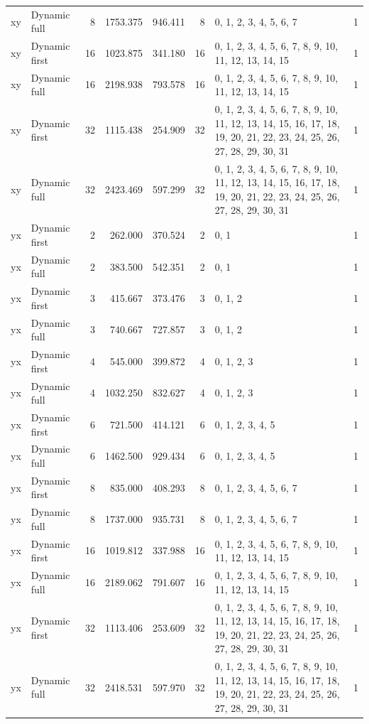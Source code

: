 \documentclass[10pt,a4paper]{article}
\begin{document}
\begin{longtable}{@{}p{23mm}p{29mm}rrrrp{36mm}r@{}}
xy & Dynamic full & 8 & 1753.375 & 946.411 & 8 & 0, 1, 2, 3, 4, 5, 6, 7 & 1 \\
xy & Dynamic first & 16 & 1023.875 & 341.180 & 16 & 0, 1, 2, 3, 4, 5, 6, 7, 8, 9, 10, 11, 12, 13, 14, 15 & 1 \\
xy & Dynamic full & 16 & 2198.938 & 793.578 & 16 & 0, 1, 2, 3, 4, 5, 6, 7, 8, 9, 10, 11, 12, 13, 14, 15 & 1 \\
xy & Dynamic first & 32 & 1115.438 & 254.909 & 32 & 0, 1, 2, 3, 4, 5, 6, 7, 8, 9, 10, 11, 12, 13, 14, 15, 16, 17, 18, 19, 20, 21, 22, 23, 24, 25, 26, 27, 28, 29, 30, 31 & 1 \\
xy & Dynamic full & 32 & 2423.469 & 597.299 & 32 & 0, 1, 2, 3, 4, 5, 6, 7, 8, 9, 10, 11, 12, 13, 14, 15, 16, 17, 18, 19, 20, 21, 22, 23, 24, 25, 26, 27, 28, 29, 30, 31 & 1 \\
yx & Dynamic first & 2 & 262.000 & 370.524 & 2 & 0, 1 & 1 \\
yx & Dynamic full & 2 & 383.500 & 542.351 & 2 & 0, 1 & 1 \\
yx & Dynamic first & 3 & 415.667 & 373.476 & 3 & 0, 1, 2 & 1 \\
yx & Dynamic full & 3 & 740.667 & 727.857 & 3 & 0, 1, 2 & 1 \\
yx & Dynamic first & 4 & 545.000 & 399.872 & 4 & 0, 1, 2, 3 & 1 \\
yx & Dynamic full & 4 & 1032.250 & 832.627 & 4 & 0, 1, 2, 3 & 1 \\
yx & Dynamic first & 6 & 721.500 & 414.121 & 6 & 0, 1, 2, 3, 4, 5 & 1 \\
yx & Dynamic full & 6 & 1462.500 & 929.434 & 6 & 0, 1, 2, 3, 4, 5 & 1 \\
yx & Dynamic first & 8 & 835.000 & 408.293 & 8 & 0, 1, 2, 3, 4, 5, 6, 7 & 1 \\
yx & Dynamic full & 8 & 1737.000 & 935.731 & 8 & 0, 1, 2, 3, 4, 5, 6, 7 & 1 \\
yx & Dynamic first & 16 & 1019.812 & 337.988 & 16 & 0, 1, 2, 3, 4, 5, 6, 7, 8, 9, 10, 11, 12, 13, 14, 15 & 1 \\
yx & Dynamic full & 16 & 2189.062 & 791.607 & 16 & 0, 1, 2, 3, 4, 5, 6, 7, 8, 9, 10, 11, 12, 13, 14, 15 & 1 \\
yx & Dynamic first & 32 & 1113.406 & 253.609 & 32 & 0, 1, 2, 3, 4, 5, 6, 7, 8, 9, 10, 11, 12, 13, 14, 15, 16, 17, 18, 19, 20, 21, 22, 23, 24, 25, 26, 27, 28, 29, 30, 31 & 1 \\
yx & Dynamic full & 32 & 2418.531 & 597.970 & 32 & 0, 1, 2, 3, 4, 5, 6, 7, 8, 9, 10, 11, 12, 13, 14, 15, 16, 17, 18, 19, 20, 21, 22, 23, 24, 25, 26, 27, 28, 29, 30, 31 & 1 \\
\end{longtable}\normalsize\setlength{\tabcolsep}{6pt}
\clearpage
\end{document}
